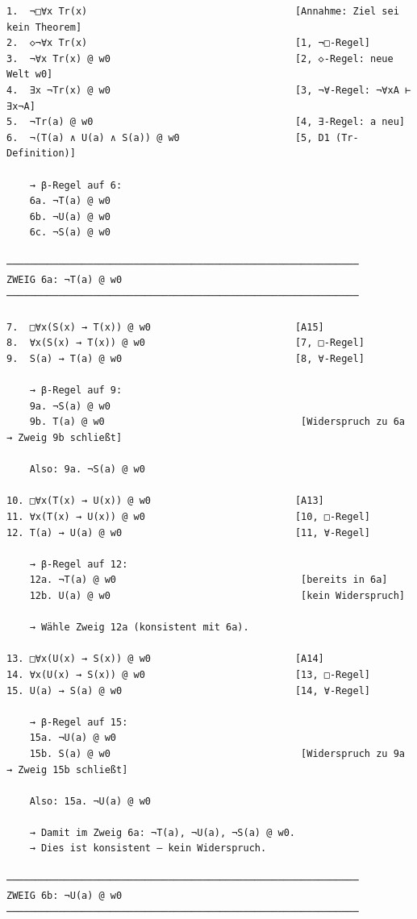 \documentclass[
]{article}
\begin{document}
\begin{verbatim}
1.  ¬□∀x Tr(x)                                    [Annahme: Ziel sei kein Theorem]
2.  ◇¬∀x Tr(x)                                    [1, ¬□-Regel]
3.  ¬∀x Tr(x) @ w0                                [2, ◇-Regel: neue Welt w0]
4.  ∃x ¬Tr(x) @ w0                                [3, ¬∀-Regel: ¬∀xA ⊢ ∃x¬A]
5.  ¬Tr(a) @ w0                                   [4, ∃-Regel: a neu]
6.  ¬(T(a) ∧ U(a) ∧ S(a)) @ w0                    [5, D1 (Tr-Definition)]

    → β-Regel auf 6:
    6a. ¬T(a) @ w0
    6b. ¬U(a) @ w0
    6c. ¬S(a) @ w0

─────────────────────────────────────────────────────────────
ZWEIG 6a: ¬T(a) @ w0
─────────────────────────────────────────────────────────────

7.  □∀x(S(x) → T(x)) @ w0                         [A15]
8.  ∀x(S(x) → T(x)) @ w0                          [7, □-Regel]
9.  S(a) → T(a) @ w0                              [8, ∀-Regel]

    → β-Regel auf 9:
    9a. ¬S(a) @ w0
    9b. T(a) @ w0                                  [Widerspruch zu 6a → Zweig 9b schließt]

    Also: 9a. ¬S(a) @ w0

10. □∀x(T(x) → U(x)) @ w0                         [A13]
11. ∀x(T(x) → U(x)) @ w0                          [10, □-Regel]
12. T(a) → U(a) @ w0                              [11, ∀-Regel]

    → β-Regel auf 12:
    12a. ¬T(a) @ w0                                [bereits in 6a]
    12b. U(a) @ w0                                 [kein Widerspruch]

    → Wähle Zweig 12a (konsistent mit 6a).

13. □∀x(U(x) → S(x)) @ w0                         [A14]
14. ∀x(U(x) → S(x)) @ w0                          [13, □-Regel]
15. U(a) → S(a) @ w0                              [14, ∀-Regel]

    → β-Regel auf 15:
    15a. ¬U(a) @ w0
    15b. S(a) @ w0                                 [Widerspruch zu 9a → Zweig 15b schließt]

    Also: 15a. ¬U(a) @ w0

    → Damit im Zweig 6a: ¬T(a), ¬U(a), ¬S(a) @ w0.
    → Dies ist konsistent – kein Widerspruch.

─────────────────────────────────────────────────────────────
ZWEIG 6b: ¬U(a) @ w0
─────────────────────────────────────────────────────────────


\end{verbatim}
\end{document}
